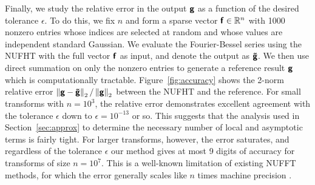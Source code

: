 Finally, we study the relative error in the output $\vct{g}$ as a function of
the desired tolerance $\epsilon$. To do this, we fix $n$ and form a sparse
vector $\vct{f} \in \R^n$ with 1000 nonzero entries whose indices are selected
at random and whose values are independent standard Gaussian. We evaluate the
Fourier-Bessel series using the NUFHT with the full vector $\vct{f}$ as input,
and denote the output as $\vct{\tilde{g}}$. We then use direct summation on only
the nonzero entries to generate a reference result $\vct{g}$ which is
computationally tractable. Figure~\ref{fig:accuracy} shows the 2-norm relative
error $\norm[2]{\vct{g} - \vct{\tilde{g}}} / \norm[2]{\vct{g}}$ between the
NUFHT and the reference. For small transforms with $n=10^3$, the relative error
demonstrates excellent agreement with the tolerance $\epsilon$ down to $\epsilon
= 10^{-13}$ or so. This suggests that the analysis used in
Section~\ref{sec:approx} to determine the necessary number of local and
asymptotic terms is fairly tight. For larger transforms, however, the error
saturates, and regardless of the tolerance $\epsilon$ our method gives at most 9
digits of accuracy for transforms of size $n=10^7$. This is a well-known
limitation of existing NUFFT methods, for which the error generally scales like
$n$ times machine precision \cite[Remark 9]{barnett2019parallel}.

